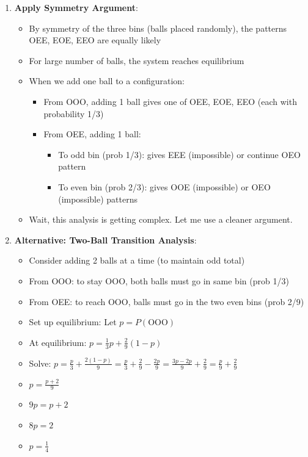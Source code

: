 \documentclass[12pt]{article}
\begin{document}
\begin{solutionbox}
\begin{enumerate}[leftmargin=*]
    \item \textbf{Apply Symmetry Argument}: 
    \begin{itemize}
        \item By symmetry of the three bins (balls placed randomly), the patterns OEE, EOE, EEO are equally likely
        \item For large number of balls, the system reaches equilibrium
        \item When we add one ball to a configuration:
        \begin{itemize}
            \item From OOO, adding 1 ball gives one of OEE, EOE, EEO (each with probability 1/3)
            \item From OEE, adding 1 ball:
            \begin{itemize}
                \item To odd bin (prob 1/3): gives EEE (impossible) or continue OEO pattern
                \item To even bin (prob 2/3): gives OOE (impossible) or OEO (impossible) patterns
            \end{itemize}
        \end{itemize}
        \item Wait, this analysis is getting complex. Let me use a cleaner argument.
    \end{itemize}
    
    \item \textbf{Alternative: Two-Ball Transition Analysis}: 
    \begin{itemize}
        \item Consider adding 2 balls at a time (to maintain odd total)
        \item From OOO: to stay OOO, both balls must go in same bin (prob 1/3)
        \item From OEE: to reach OOO, balls must go in the two even bins (prob 2/9)
        \item Set up equilibrium: Let $p = P(\text{OOO})$
        \item At equilibrium: $p = \frac{1}{3}p + \frac{2}{9}(1-p)$
        \item Solve: $p = \frac{p}{3} + \frac{2(1-p)}{9} = \frac{p}{3} + \frac{2}{9} - \frac{2p}{9} = \frac{3p - 2p}{9} + \frac{2}{9} = \frac{p}{9} + \frac{2}{9}$
        \item $p = \frac{p + 2}{9}$
        \item $9p = p + 2$
        \item $8p = 2$
        \item $p = \frac{1}{4}$
    \end{itemize}
    

\end{enumerate}
\end{solutionbox}
\end{document}
